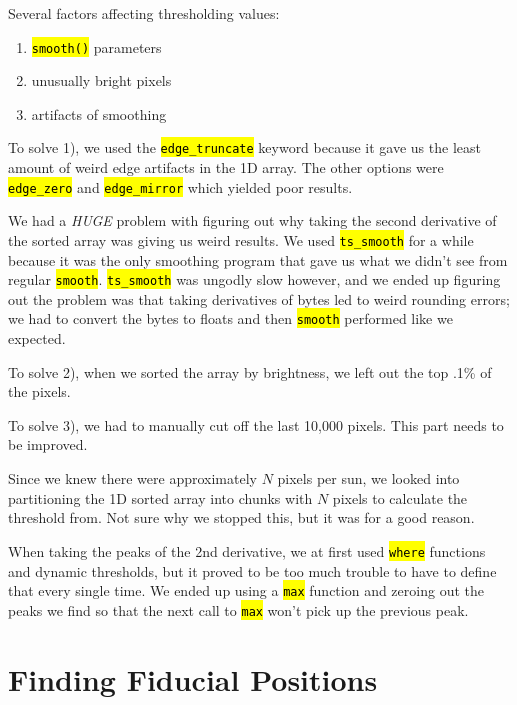 \documentclass[10pt]{scrartcl}
\begin{document}
Several factors affecting thresholding values:

\begin{enumerate}
    \item \hl{\texttt{smooth()}} parameters
    \item unusually bright pixels
    \item artifacts of smoothing
\end{enumerate}

To solve 1), we used the \hl{\texttt{edge\_truncate}} keyword because it gave us the least amount of weird edge artifacts in the 1D array. The other options were \hl{\texttt{edge\_zero}} and \hl{\texttt{edge\_mirror}} which yielded poor results. 

We had a \emph{HUGE} problem with figuring out why taking the second derivative of the sorted array was giving us weird results. We used \hl{\texttt{ts\_smooth}} for a while because it was the only smoothing program that gave us what we didn't see from regular \hl{\texttt{smooth}}. \hl{\texttt{ts\_smooth}} was ungodly slow however, and we ended up figuring out the problem was that taking derivatives of bytes led to weird rounding errors; we had to convert the bytes to floats and then \hl{\texttt{smooth}} performed like we expected.

To solve 2), when we sorted the array by brightness, we left out the top .1\% of the pixels.

To solve 3), we had to manually cut off the last 10,000 pixels. This part needs to be improved.

Since we knew there were approximately $N$ pixels per sun, we looked into partitioning the 1D sorted array into chunks with $N$ pixels to calculate the threshold from. Not sure why we stopped this, but it was for a good reason.

When taking the peaks of the 2nd derivative, we at first used \hl{\texttt{where}} functions and dynamic thresholds, but it proved to be too much trouble to have to define that every single time. We ended up using a \hl{\texttt{max}} function and zeroing out the peaks we find so that the next call to \hl{\texttt{max}} won't pick up the previous peak.

\clearpage


\section{Finding Fiducial Positions} %
\label{sec:finding_fiducial_positions}
\end{document}
